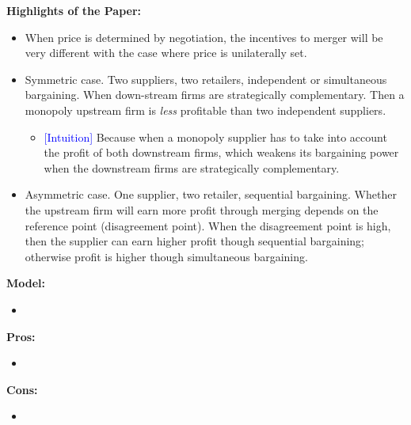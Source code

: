 \documentclass{book}
\theoremstyle{plain}
\theoremstyle{definition}
\begin{document}
\textbf{}

\vspace{1em}
\noindent
\textbf{Highlights of the Paper:}
\begin{itemize}
	\item When price is determined by negotiation, the incentives to merger will be very different with the case where price is unilaterally set.
	\item Symmetric case. Two suppliers, two retailers, independent or simultaneous bargaining. When down-stream firms are strategically complementary. Then a monopoly upstream firm is \textit{less} profitable than two independent suppliers.
	\begin{itemize}
		\item \textcolor{blue}{[Intuition]} Because when a monopoly supplier has to take into account the profit of both downstream firms, which weakens its bargaining power when the downstream firms are strategically complementary.
	\end{itemize}
	\item Asymmetric case. One supplier, two retailer, sequential bargaining. Whether the upstream firm will earn more profit through merging depends on the reference point (disagreement point). When the disagreement point is high, then the supplier can earn higher profit though sequential bargaining; otherwise profit is higher though simultaneous bargaining.
\end{itemize}

\vspace{1em}
\noindent
\textbf{Model:}
\begin{itemize}
	\item 
\end{itemize}

\vspace{1em}
\noindent
\textbf{Pros:}
\begin{itemize}
	\item 
\end{itemize}

\vspace{1em}
\noindent
\textbf{Cons:}
\begin{itemize}
	\item 
\end{itemize}


\end{document}
